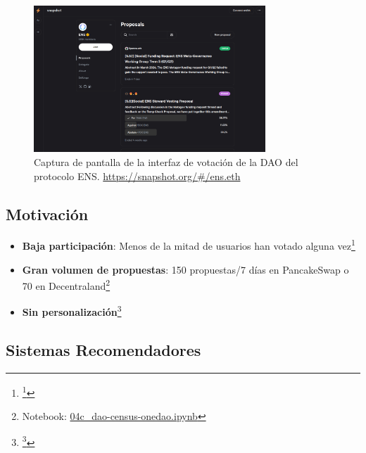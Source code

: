 \begin{frame}
    \begin{figure}
        \centering
        \includegraphics[width=87mm]{images/screenshots/Snapshot_ENS_Proposals.png}
        \caption{Captura de pantalla de la interfaz de votación de la DAO del protocolo ENS. \url{https://snapshot.org/\#/ens.eth}}
    \end{figure}
\end{frame}

\subsection{Motivación}

\begin{frame}
    \begin{itemize}[<+->]
        \item \textbf{Baja participación}: Menos de la mitad de usuarios han votado alguna vez\footnote{\footcite{arroyo_dao-analyzer_2022}}
        \item \textbf{Gran volumen de propuestas}: 150 propuestas/7 días en PancakeSwap o 70 en Decentraland\footnote{Notebook: \href{https://github.com/daviddavo/upm-tfm-notebooks/blob/main/04c_dao-census-onedao.ipynb}{04c\_dao-census-onedao.ipynb}}
        \item \textbf{Sin personalización}\footnote{\footcite{aviv_all_2023}}
    \end{itemize}
\end{frame}

\subsection{Sistemas Recomendadores}

